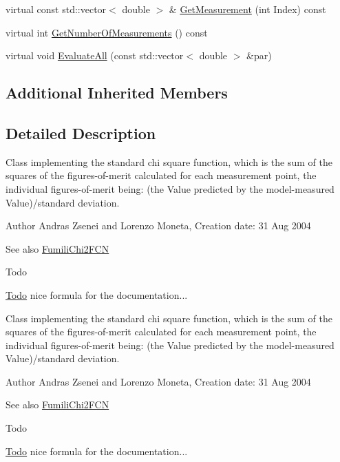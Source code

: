 \begin{DoxyCompactItemize}
\item 
virtual const std\+::vector$<$ double $>$ \& \mbox{\hyperlink{classROOT_1_1Minuit2_1_1FumiliStandardChi2FCN_a3bbc9a9cb77ce45aa764aa1f6e74349c}{Get\+Measurement}} (int Index) const
\item 
virtual int \mbox{\hyperlink{classROOT_1_1Minuit2_1_1FumiliStandardChi2FCN_a868b7c1aa7d2597db475ca99799c9131}{Get\+Number\+Of\+Measurements}} () const
\item 
virtual void \mbox{\hyperlink{classROOT_1_1Minuit2_1_1FumiliStandardChi2FCN_ace15dd1aad435e460c523bc37bff12a8}{Evaluate\+All}} (const std\+::vector$<$ double $>$ \&par)
\end{DoxyCompactItemize}
\subsection*{Additional Inherited Members}


\subsection{Detailed Description}
Class implementing the standard chi square function, which is the sum of the squares of the figures-\/of-\/merit calculated for each measurement point, the individual figures-\/of-\/merit being\+: (the Value predicted by the model-\/measured Value)/standard deviation.

\begin{DoxyAuthor}{Author}
Andras Zsenei and Lorenzo Moneta, Creation date\+: 31 Aug 2004
\end{DoxyAuthor}
\begin{DoxySeeAlso}{See also}
\mbox{\hyperlink{classROOT_1_1Minuit2_1_1FumiliChi2FCN}{Fumili\+Chi2\+F\+CN}}
\end{DoxySeeAlso}
\begin{DoxyRefDesc}{Todo}
\item[\mbox{\hyperlink{todo__todo000009}{Todo}}]nice formula for the documentation...\end{DoxyRefDesc}


Class implementing the standard chi square function, which is the sum of the squares of the figures-\/of-\/merit calculated for each measurement point, the individual figures-\/of-\/merit being\+: (the Value predicted by the model-\/measured Value)/standard deviation.

\begin{DoxyAuthor}{Author}
Andras Zsenei and Lorenzo Moneta, Creation date\+: 31 Aug 2004
\end{DoxyAuthor}
\begin{DoxySeeAlso}{See also}
\mbox{\hyperlink{classROOT_1_1Minuit2_1_1FumiliChi2FCN}{Fumili\+Chi2\+F\+CN}}
\end{DoxySeeAlso}
\begin{DoxyRefDesc}{Todo}
\item[\mbox{\hyperlink{todo__todo000021}{Todo}}]nice formula for the documentation...\end{DoxyRefDesc}


